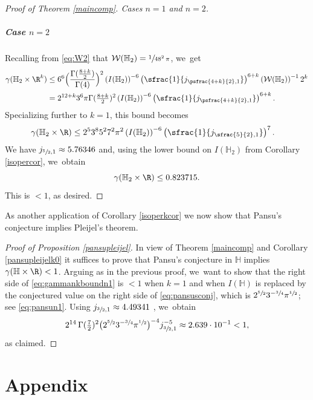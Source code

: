 \begin{proof}[Proof of Theorem \ref{maincomp}. Cases $n\!=\!1$ and $n\!=\!2$]
\subsubsection*{Case $n=2$} Recalling from \eqref{eq:W2} that $\mathcal W(\mathbb H_2) = \sfrac{1}{48^2\,\pi}$, we~get
\begin{align*}
\gamma(\mathbb H_2\times\R^k)
& \leq
6^6 \Bigl(\frac{\Gamma(\frac{8+k}{2})}{\Gamma(4)}\Bigr)^2
\left(I(\mathbb H_2)\right)^{-6} \left(\sfrac{1}{j_{\psfrac{4+k}{2},1}}\right)^{6+k}
\left(\mathcal W(\mathbb H_2)\right)^{-1} 2^k \\
& = 2^{12+k} 3^6 \pi \Gamma(\tfrac{8+k}{2})^2 \left(I(\mathbb H_2)\right)^{-6} \left(\sfrac{1}{j_{\psfrac{4+k}{2},1}}\right)^{6+k}.
\end{align*}
Specializing further to $k=1$, this bound becomes
\begin{align*}
\gamma(\mathbb H_2\times\R)
& \leq 2^{5} 3^8 5^2 7^2 \pi^2 \left(I(\mathbb H_2)\right)^{-6} \left(\sfrac{1}{j_{\sfrac{5}{2},1}}\right)^{7}.
\end{align*}
We have $j_{\sfrac52,1}\approx 5.76346$ \cite[Table\,10.6]{AbSt} and, using the lower bound on $I(\mathbb H_2)$ from Corollary \ref{isopercor}, we~obtain
\[
\gamma(\mathbb H_2\times\R) \leq 0.823715.
\]
This is $<1$, as desired.
\end{proof}

As another application of Corollary \ref{isoperkcor} we now show that Pansu's conjecture implies Pleijel's theorem.

\begin{proof}[Proof of Proposition \ref{pansupleijel}]
In view of Theorem \ref{maincomp} and Corollary \ref{pansupleijelk0} it suffices to prove that Pansu's conjecture in $\mathbb H$ implies $\gamma(\mathbb H\times\R)<1$. Arguing as in the previous proof, we~want to show that the right side of \eqref{eq:gammankboundn1} is $<1$ when $k=1$ and when $I(\mathbb H)$ is replaced by the conjectured value on the right side of \eqref{eq:pansusconj}, which is $2^{\sfrac 52} 3^{-\sfrac 34}\pi^{\sfrac 12}$; see \eqref{eq:pansun1}. Using $j_{\sfrac32,1}\approx 4.49341$ \cite[Table\,10.6]{AbSt}, we~obtain
\[
2^{14} \,\Gamma(\tfrac 72)^2 \bigl(2^{\sfrac 52} 3^{-\sfrac 34}\pi^{\sfrac 12}\bigr)^{-4} j_{\sfrac32,1}^{-5} \approx 2.639 \cdot 10^{-1} <1,
\]
as claimed.
\end{proof}

\appendix

\part{Appendix}

